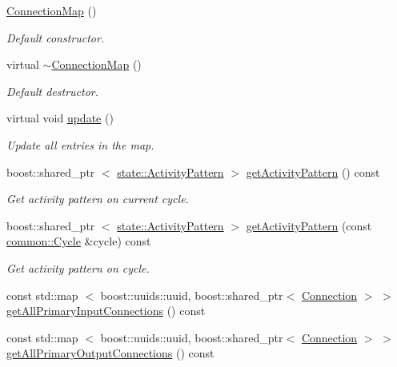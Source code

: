 \begin{DoxyCompactItemize}
\item 
\hyperlink{classcryomesh_1_1components_1_1ConnectionMap_a512061797f1a737c674b6fae284295c7}{\-Connection\-Map} ()
\begin{DoxyCompactList}\small\item\em \-Default constructor. \end{DoxyCompactList}\item 
virtual \hyperlink{classcryomesh_1_1components_1_1ConnectionMap_a7c22a125652d332da2d8ceb194ad925e}{$\sim$\-Connection\-Map} ()
\begin{DoxyCompactList}\small\item\em \-Default destructor. \end{DoxyCompactList}\item 
virtual void \hyperlink{classcryomesh_1_1components_1_1ConnectionMap_aadb06c43b0eae37154fd7efb22a08949}{update} ()
\begin{DoxyCompactList}\small\item\em \-Update all entries in the map. \end{DoxyCompactList}\item 
boost\-::shared\-\_\-ptr\*
$<$ \hyperlink{classcryomesh_1_1state_1_1ActivityPattern}{state\-::\-Activity\-Pattern} $>$ \hyperlink{classcryomesh_1_1components_1_1ConnectionMap_a6de4ccc8a4a85199329c0d2a884a0dba}{get\-Activity\-Pattern} () const 
\begin{DoxyCompactList}\small\item\em \-Get activity pattern on current cycle. \end{DoxyCompactList}\item 
boost\-::shared\-\_\-ptr\*
$<$ \hyperlink{classcryomesh_1_1state_1_1ActivityPattern}{state\-::\-Activity\-Pattern} $>$ \hyperlink{classcryomesh_1_1components_1_1ConnectionMap_aeb905313475043da7bff0739925b5483}{get\-Activity\-Pattern} (const \hyperlink{classcryomesh_1_1common_1_1Cycle}{common\-::\-Cycle} \&cycle) const 
\begin{DoxyCompactList}\small\item\em \-Get activity pattern on cycle. \end{DoxyCompactList}\item 
const std\-::map\*
$<$ boost\-::uuids\-::uuid, \*
boost\-::shared\-\_\-ptr$<$ \hyperlink{classcryomesh_1_1components_1_1Connection}{\-Connection} $>$ $>$ \hyperlink{classcryomesh_1_1components_1_1ConnectionMap_afa08a6bd4894d7ff84db83a7eb15ad37}{get\-All\-Primary\-Input\-Connections} () const 
\item 
const std\-::map\*
$<$ boost\-::uuids\-::uuid, \*
boost\-::shared\-\_\-ptr$<$ \hyperlink{classcryomesh_1_1components_1_1Connection}{\-Connection} $>$ $>$ \hyperlink{classcryomesh_1_1components_1_1ConnectionMap_a9c6868c8f9b977ceb99e799fb6cc98eb}{get\-All\-Primary\-Output\-Connections} () const 
\end{DoxyCompactItemize}
